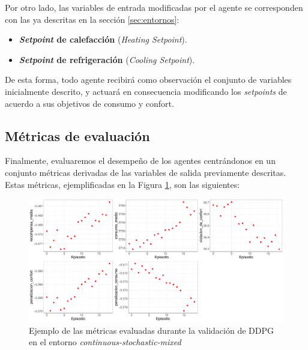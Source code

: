 Por otro lado, las variables de entrada modificadas por el agente se corresponden con las ya descritas en la sección \ref{sec:entornos}:

\begin{itemize}
    \item \textbf{\textit{Setpoint} de calefacción }(\textit{Heating Setpoint}).
    \item \textbf{\textit{Setpoint} de refrigeración} (\textit{Cooling Setpoint}).
\end{itemize}

De esta forma, todo agente recibirá como observación el conjunto de variables inicialmente descrito, y actuará en consecuencia modificando los \textit{setpoints} de acuerdo a sus objetivos de consumo y confort. 

\subsection{Métricas de evaluación}
\label{sec:metricas-evaluacion}

Finalmente, evaluaremos el desempeño de los agentes centrándonos en un conjunto métricas derivadas de las variables de salida previamente descritas. Estas métricas, ejemplificadas en la Figura \ref{fig:DDPG-results}, son las siguientes:

\begin{figure}
    \centering
    \includegraphics[width=\textwidth]{imagenes/ddpg-cont-mixed-fixed.pdf}
    \caption{Ejemplo de las métricas evaluadas durante la validación de DDPG en el entorno \textit{continuous-stochastic-mixed}}
    \label{fig:DDPG-results}
\end{figure}

